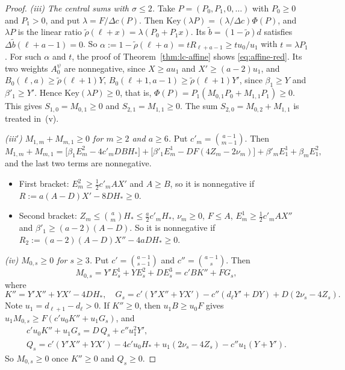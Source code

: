 \begin{proof}
\emph{(iii) The central sums with $\sigma\leq2$.} Take $P=(P_0,P_1,0,\ldots)$ with $P_0\geq0$ and $P_1>0$, and put $\lambda=F/\Delta c(P)$. Then $\mathrm{Key}(\lambda P)=(\lambda/\Delta c)\Phi(P)$, and $\lambda P$ is the linear ratio $\tilde\rho(\ell+x)=\lambda(P_0+P_1x)$. Its $\tilde b=(1-\tilde\rho)d$ satisfies $\Delta\tilde b(\ell+a-1)=0$. So $\alpha:=1-\tilde\rho(\ell+a)=tR_{\ell+a-1}\geq tu_0/u_1$ with $t=\lambda P_1$. For such $\alpha$ and $t$, the proof of Theorem~\ref{thm:lc-affine} shows \eqref{eq:affine-red}. Its two weights $A^\psi_0$ are nonnegative, since $X\geq au_1$ and $X'\geq(a-2)u_1$, and $B_0(\ell,a)\geq\tilde\rho(\ell+1)Y$, $B_0(\ell+1,a-1)\geq\tilde\rho(\ell+1)Y'$, since $\beta_1\geq Y$ and $\beta'_1\geq Y'$. Hence $\mathrm{Key}(\lambda P)\geq0$, that is, $\Phi(P)=P_1(M_{0,1}P_0+M_{1,1}P_1)\geq0$. This gives $S_{1,0}=M_{0,1}\geq0$ and $S_{2,1}=M_{1,1}\geq0$. The sum $S_{2,0}=M_{0,2}+M_{1,1}$ is treated in~(v).

\emph{(iii$'$) $M_{1,m}+M_{m,1}\geq0$ for $m\geq2$ and $a\geq6$.} Put $c'_m=\binom{a-1}{m-1}$. Then
\[
M_{1,m}+M_{m,1}=\bigl[\beta_1E^2_m-4c'_mDBH_*\bigr]+\bigl[\beta'_1E^1_m-DF(4Z_m-2\nu_m)\bigr]+\beta'_mE^1_1+\beta_mE^2_1,
\]
and the last two terms are nonnegative.
\begin{itemize}
\item First bracket: $E^2_m\geq\frac12c'_mAX'$ and $A\geq B$, so it is nonnegative if $R:=a(A-D)X'-8DH_*\geq0$.
\item Second bracket: $Z_m\leq\binom amH_*\leq\frac a2c'_mH_*$, $\nu_m\geq0$, $F\leq A$, $E^1_m\geq\frac12c'_mAX''$ and $\beta'_1\geq(a-2)(A-D)$. So it is nonnegative if $R_2:=(a-2)(A-D)X''-4aDH_*\geq0$.
\end{itemize}

\emph{(iv) $M_{0,s}\geq0$ for $s\geq3$.} Put $c'=\binom{a-1}{s-1}$ and $c''=\binom{a-1}s$. Then
\[
M_{0,s}=Y'E^1_s+YE^2_s+DE^3_s=c'BK''+FG_s,
\]
where
\[
K''=Y'X''+YX'-4DH_*,\quad G_s=c'(Y'X''+YX')-c''(d_\ell Y'+DY)+D(2\nu_s-4Z_s).
\]
Note $u_1=d_{\ell+1}-d_\ell>0$. If $K''\geq0$, then $u_1B\geq u_0F$ gives $u_1M_{0,s}\geq F(c'u_0K''+u_1G_s)$, and
\[
\begin{gathered}
c'u_0K''+u_1G_s=D\,Q_s+c''u_1^2Y',\\
Q_s=c'(Y'X''+YX')-4c'u_0H_*+u_1(2\nu_s-4Z_s)-c''u_1(Y+Y').
\end{gathered}
\]
So $M_{0,s}\geq0$ once $K''\geq0$ and $Q_s\geq0$.


\end{proof}
